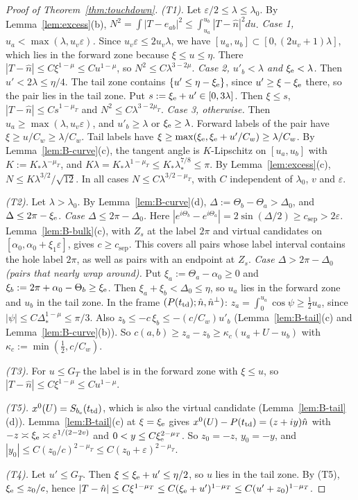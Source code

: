 \begin{proof}[Proof of Theorem~\ref{thm:touchdown}]
\emph{(T1).} Let $\varepsilon/2\le\lambda\le\lambda_0$. By Lemma~\ref{lem:excess}(b), $N^2=\int|T-e_{ab}|^2\le\int_{u_a}^{u_b}|T-\hat n|^2du$.
\emph{Case 1, $u_a<\max(\lambda,u_v\varepsilon)$.} Since $u_v\varepsilon\le2u_v\lambda$, we have $[u_a,u_b]\subset[0,(2u_v+1)\lambda]$,
which lies in the forward zone because $\xi\le u\le\eta$. There $|T-\hat n|\le C\xi^{1-\mu}\le Cu^{1-\mu}$, so
$N^2\le C\lambda^{3-2\mu}$.
\emph{Case 2, $u'_b<\lambda$ and $\xi_{\mathrm{e}}<\lambda$.} Then $u'<2\lambda\le\eta/4$. The tail zone contains $\{u'\le\eta-\xi_{\mathrm{e}}\}$, since $u'\ge\xi-\xi_{\mathrm{e}}$
there, so the pair lies in the tail zone. Put $s:=\xi_{\mathrm{e}}+u'\in[0,3\lambda]$. Then $\xi\le s$, $|T-\hat n|\le Cs^{1-\mu_T}$ and
$N^2\le C\lambda^{3-2\mu_T}$.
\emph{Case 3, otherwise.} Then $u_a\ge\max(\lambda,u_v\varepsilon)$, and $u'_b\ge\lambda$ or $\xi_{\mathrm{e}}\ge\lambda$. Forward labels of the pair
have $\xi\ge u/C_w\ge\lambda/C_w$. Tail labels have $\xi\ge\max(\xi_{\mathrm{e}},\xi_{\mathrm{e}}+u'/C_w)\ge\lambda/C_w$. By Lemma~\ref{lem:B-curve}(c), the
tangent angle is $K$-Lipschitz on $[u_a,u_b]$ with $K:=K_*\lambda^{-\mu_T}$, and $K\lambda=K_*\lambda^{1-\mu_T}\le
K_*\lambda_*^{7/8}\le\pi$. By Lemma~\ref{lem:excess}(c),
$N\le K\lambda^{3/2}/\sqrt{12}$.
In all cases $N\le C\lambda^{3/2-\mu_T}$, with $C$ independent of $\lambda_0$, $v$ and $\varepsilon$.

\emph{(T2).} Let $\lambda>\lambda_0$. By Lemma~\ref{lem:B-curve}(d), $\Delta:=\Theta_b-\Theta_a>\Delta_0$, and $\Delta\le2\pi-\xi_{\mathrm{e}}$.
\emph{Case $\Delta\le2\pi-\Delta_0$.} Here $|e^{i\Theta_b}-e^{i\Theta_a}|=2\sin(\Delta/2)\ge c_{\mathrm{sep}}>2\varepsilon$. Lemma~\ref{lem:B-bulk}(c),
with $Z_s$ at the label $2\pi$ and virtual candidates on $[\alpha_0,\alpha_0+\xi_1\varepsilon]$, gives $c\ge c_{\mathrm{sep}}$. This covers
all pairs whose label interval contains the hole label $2\pi$, as well as pairs with an endpoint at $Z_s$.
\emph{Case $\Delta>2\pi-\Delta_0$ (pairs that nearly wrap around).} Put $\xi_a:=\Theta_a-\alpha_0\ge0$ and
$\xi_b:=2\pi+\alpha_0-\Theta_b\ge\xi_{\mathrm{e}}$. Then $\xi_a+\xi_b<\Delta_0\le\eta$, so $u_a$ lies in the forward zone and $u_b$ in the tail zone.
In the frame $(P(t_{\mathrm{td}});\hat n,\hat n^\perp)$: $z_a=\int_0^{u_a}\cos\psi\ge\frac12u_a$, since $|\psi|\le C\Delta_*^{1-\mu}\le\pi/3$. Also
$z_b\le-c\,\xi_b\le-(c/C_w)u'_b$ (Lemma~\ref{lem:B-tail}(c) and Lemma~\ref{lem:B-curve}(b)). So
$c(a,b)\ge z_a-z_b\ge\kappa_c(u_a+U-u_b)$ with $\kappa_c:=\min(\frac12,c/C_w)$.

\emph{(T3).} For $u\le G_T$ the label is in the forward zone with $\xi\le u$, so $|T-\hat n|\le C\xi^{1-\mu}\le Cu^{1-\mu}$.

\emph{(T5).} $x^0(U)=S_{b_{\mathrm{e}}}(t_{\mathrm{td}})$, which is also the virtual candidate (Lemma~\ref{lem:B-tail}(d)). Lemma~\ref{lem:B-tail}(c) at
$\xi=\xi_{\mathrm{e}}$ gives $x^0(U)-P(t_{\mathrm{td}})=(z+iy)\hat n$ with $-z\asymp\xi_{\mathrm{e}}\asymp\varepsilon^{1/(2-2v)}$ and $0<y\le C\xi_{\mathrm{e}}^{2-\mu_T}$. So
$z_0=-z$, $y_0=-y$, and $|y_0|\le C(z_0/c)^{2-\mu_T}\le C(z_0+\varepsilon)^{2-\mu_T}$.

\emph{(T4).} Let $u'\le G_T$. Then $\xi\le\xi_{\mathrm{e}}+u'\le\eta/2$, so $u$ lies in the tail zone. By (T5), $\xi_{\mathrm{e}}\le z_0/c$, hence
$|T-\hat n|\le C\xi^{1-\mu_T}\le C(\xi_{\mathrm{e}}+u')^{1-\mu_T}\le C(u'+z_0)^{1-\mu_T}$.
\end{proof}

